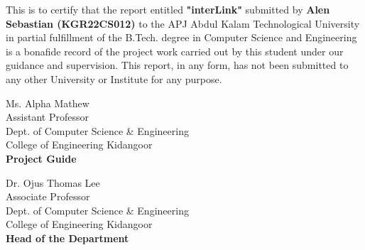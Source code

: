 \documentclass[twoside,a4paper,openright]{report} %
\begin{document}
This is to certify that the report entitled \textbf{\large "interLink"} submitted by \textbf{Alen Sebastian (KGR22CS012)} to the APJ Abdul Kalam Technological University in partial fulfillment of the B.Tech. degree in Computer Science and Engineering is a bonafide record of the project work carried out by this student under our guidance and supervision. This report, in any form, has not been submitted to any other University or Institute for any purpose.


\vspace{1cm}  %

\noindent
\begin{minipage}{0.45\linewidth}
	\begin{flushleft}                         
		Ms. Alpha Mathew \\
		\footnotesize{Assistant Professor\\
			Dept. of Computer Science \& Engineering\\
			College of Engineering Kidangoor}\\
		\textbf{Project Guide} \\
	\end{flushleft}
\end{minipage}%
\hfill
\begin{minipage}{0.45\linewidth}
	\begin{flushright}                                       
		Dr. Ojus Thomas Lee \\
		\footnotesize{Associate Professor\\
			Dept. of Computer Science \& Engineering\\
			College of Engineering Kidangoor}\\
		\textbf{Head of the Department} \\
	\end{flushright}
\end{minipage}

\vspace{1cm} %
\end{document}
